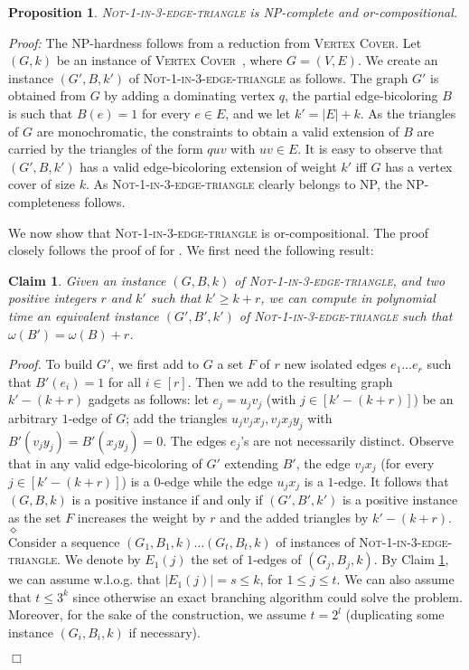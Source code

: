 \documentclass[11pt]{article}
\newenvironment{proof}{\noindent\textit{Proof: }}{{\hfill $\Box$}}
\newtheorem{proposition}[lemma]{Proposition}
\newtheorem{claim}[lemma]{Claim}
\newcommand{\gbc}{\textsc{Not-1-in-3-edge-triangle}}
\begin{document}
\begin{proposition} \label{prop1} 
 \gbc{} is NP-complete and or-compositional.
\end{proposition}

\begin{proof}
The NP-hardness follows from a reduction from \textsc{Vertex Cover}. Let $(G,k)$ be an instance of \textsc{Vertex Cover}~\cite{GJ79}, where $G = (V,E)$. We create an instance $(G',B,k')$ of \gbc{} as follows. The graph $G'$ is obtained from $G$ by adding a dominating vertex $q$, the partial edge-bicoloring $B$ is such that $B(e) = 1$ for every $e \in E$, and we let $k' = |E|+k$. As the triangles of $G$ are monochromatic, the constraints to obtain a valid extension of $B$ are carried by the triangles of the form $quv$ with $uv\in E$. It is easy to observe that $(G',B,k')$ has a valid edge-bicoloring extension of weight $k'$ iff $G$ has a vertex cover of size $k$. As \gbc{} clearly belongs to NP, the NP-completeness follows. 


\medskip
We now show that \gbc{} is or-compositional. The proof closely follows the proof of \cite{KW09} for \notone{}. We first need the following result:

\begin{claim}\label{lemma1} 
Given  an instance $(G,B,k)$ of \gbc{}, and two positive integers $r$ and $k'$ such that $k' \geq k+r$, we can compute in polynomial time an equivalent instance $(G',B',k')$ of \gbc{} such that $\omega(B') = \omega(B)+r$.
\end{claim}

\emph{Proof.} To build $G'$, we first add to $G$ a set $F$ of $r$ new isolated edges $e_1\dots e_r$ such that $B'(e_i)=1$ for all $i\in[r]$. Then we add to the resulting graph $k'-(k+r)$ gadgets as follows: let $e_j=u_jv_j$ (with $j\in[k'-(k+r)]$) be an arbitrary $1$-edge of $G$; add the triangles $u_jv_jx_j,v_jx_jy_j$ with $B'(v_jy_j)=B'(x_jy_j)=0$. The edges $e_j$'s are not necessarily distinct. Observe that in any valid edge-bicoloring of $G'$ extending $B'$, the edge $v_jx_j$ (for every $j\in[k'-(k+r)]$) is a $0$-edge while the edge $u_jx_j$ is a $1$-edge. It follows that $(G,B,k)$ is a positive instance if and only if $(G',B',k')$ is a positive instance as the set $F$ increases the weight by $r$ and the added triangles by $k'-(k+r)$.
\hfill $\diamond$ \\

Consider a sequence $(G_1,B_1,k)\dots (G_t,B_t,k)$ of instances of \gbc{}. 
We denote by $E_1(j)$ the set of $1$-edges of $(G_j,B_j,k)$. 
By Claim \ref{lemma1}, we can assume w.l.o.g. that $|E_1(j)|=s \leqslant k$, for $1\leqslant j\leqslant t$. We can also assume that $t\leqslant 3^k$ since otherwise an exact branching algorithm could solve the problem. Moreover, for the sake of the construction, we assume $t=2^l$ (duplicating some instance $(G_i, B_i, k)$ if necessary).



\end{proof}
\end{document}
